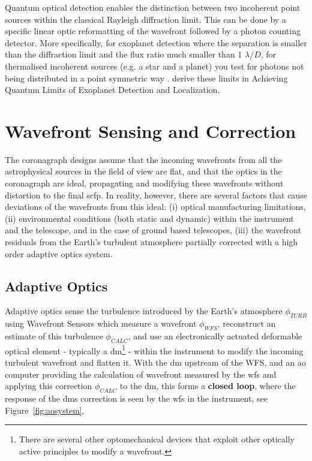 \documentclass[letterpaper]{ar-1col}
\newcommand{\ld}{$\lambda/D$}
\begin{document}
Quantum optical detection \citep{Lu18} enables the distinction between two incoherent point sources within the classical Rayleigh diffraction limit.
%
This can be done by a specific linear optic reformatting of the wavefront followed by a photon counting detector.
%
More specifically, for exoplanet detection where the separation is smaller than the diffraction limit and the flux ratio much smaller than 1 \ld{}, for thermalised incoherent sources (e.g. a star and a planet) you test for photons not being distributed in a point symmetric way \citep[e.g. ][]{Huang21}.
%
\citet{Desai23} derive these limits in Achieving Quantum Limits of Exoplanet Detection and Localization.

\section{Wavefront Sensing and Correction}

The coronagraph designs assume that the incoming wavefronts from all the astrophysical sources in the field of view are flat, and that the optics in the coronagraph are ideal, propagating and modifying these wavefronts without distortion to the final \ac{scfp}.
%
In reality, however, there are several factors that cause deviations of the wavefronts from this ideal: (i) optical manufacturing limitations, (ii) environmental conditions (both static and dynamic) within the instrument and the telescope, and in the case of ground based telescopes, (iii) the wavefront residuals from the Earth's turbulent atmosphere partially corrected with a high order adaptive optics system.

\subsection{Adaptive Optics}

Adaptive optics sense the turbulence introduced by the Earth's atmosphere $\phi_{TURB}$ using Wavefront Sensors which measure a wavefront $\phi_{WFS}$, reconstruct an estimate of this turbulence $\phi_{CALC}$, and use an electronically actuated deformable optical element - typically a \ac{dm}\footnote{There are several other optomechanical devices that exploit other optically active principles to modify a wavefront.} - within the instrument to modify the incoming turbulent wavefront and flatten it.
%
With the \ac{dm} upstream of the WFS, and an \ac{ao} computer providing the calculation of wavefront measured by the \ac{wfs} and applying this correction $\phi_{CALC}$ to the \ac{dm}, this forms a {\bf closed loop}, where the response of the \acp{dm} correction is seen by the \ac{wfs} in the instrument, see Figure~\ref{fig:aosystem}.
\end{document}
